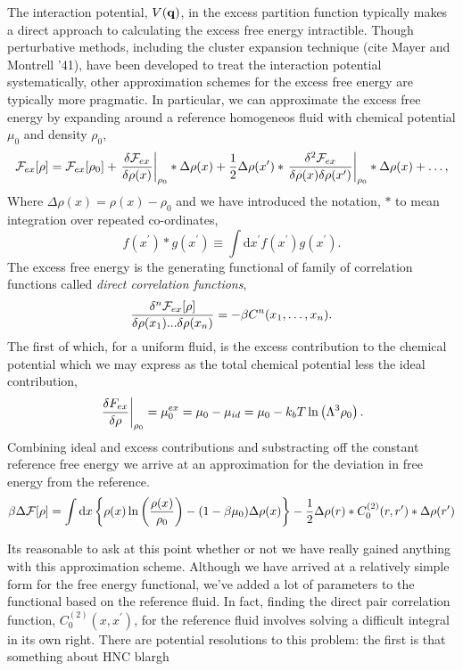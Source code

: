 The interaction potential, $V(\mathbf{q})$, in the excess partition function typically makes a direct approach to calculating the excess free energy intractible.
Though perturbative methods, including the cluster expansion technique (cite Mayer and Montrell '41), have been developed to treat the interaction potential systematically, other approximation schemes for the excess free energy are typically more pragmatic.
In particular, we can approximate the excess free energy by expanding around a reference homogeneos fluid with chemical potential $\mu_0$ and density $\rho_0$,
%
\begin{equation}
    \mathcal{F}_{ex}[\rho] = \mathcal{F}_{ex}[\rho_0] 
        + \left . \frac{\delta \mathcal{F}_{ex}}{\delta \rho(x)} \right\vert_{\rho_0} \ast \Delta\rho(x) 
        + \frac{1}{2} \Delta\rho(x^\prime) \ast 
            \left . \frac{\delta^2 \mathcal{F}_{ex}}{\delta\rho(x)\delta\rho(x^\prime)} \right\vert_{\rho_0} 
            \ast \Delta\rho(x) + \dots,
\end{equation}
%
Where $\Delta\rho(x) = \rho(x) - \rho_0$ and we have introduced the notation, $\ast$ to mean integration over repeated co-ordinates,
%
\begin{equation}
    f(x^\prime) \ast g(x^\prime) \equiv \int\mathrm{d}x^\prime f(x^\prime) g(x^\prime).
\end{equation}
%
The excess free energy is the generating functional of family of correlation functions called \textit{direct correlation functions}, 
%
\begin{equation}
    \frac{\delta^n \mathcal{F}_{ex}[\rho]}{\delta \rho(x_1) ... \delta \rho(x_n)} = -\beta C^{n}(x_1, \dots, x_n).
\end{equation}
%
The first of which, for a uniform fluid, is the excess contribution to the chemical potential which we may express as the total chemical potential less the ideal contribution, 
%
\begin{equation}
    \left.\frac{\delta F_{ex}}{\delta \rho}\right\vert_{\rho_0} = \mu_0^{ex} = \mu_0 - \mu_{id} = \mu_0 - k_bT\ln\left(\Lambda^3 \rho_0\right).
\end{equation}
%
Combining ideal and excess contributions and substracting off the constant reference free energy we arrive at an approximation for the deviation in free energy from the reference. 
%
\begin{equation}
    \beta \Delta \mathcal{F} [\rho] = 
        \int \mathrm{d}x \left\lbrace \rho(x) \ln\left(\frac{\rho(x)}{\rho_0} \right) -(1-\beta\mu_0) \Delta \rho(x)\right\rbrace
        - \frac{1}{2}\Delta \rho(r) \ast C_0^{(2)}(r, r^\prime) \ast \Delta \rho(r^\prime)
\end{equation}

Its reasonable to ask at this point whether or not we have really gained anything with this approximation scheme.
Although we have arrived at a relatively simple form for the free energy functional, we've added a lot of parameters to the functional based on the reference fluid.
In fact, finding the direct pair correlation function, $C_0^{(2)}(x, x^\prime)$, for the reference fluid involves solving a difficult integral in its own right.
There are potential resolutions to this problem: the first is that something about HNC blargh
